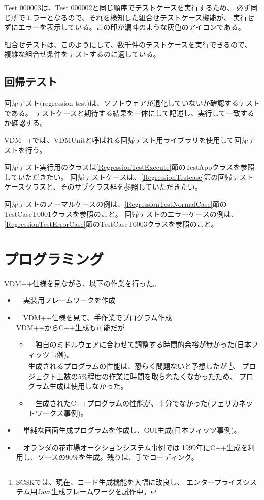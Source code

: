 Test 000003は、Test 000002と同じ順序でテストケースを実行するため、
必ず同じ所でエラーとなるので、それを検知した組合せテストケース機能が、
実行せずにエラーを表示している。この印が漏斗のような灰色のアイコンである。

組合せテストは、このようにして、数千件のテストケースを実行できるので、
複雑な組合せ条件をテストするのに適している。


\subsection{回帰テスト}
	\label{RegressionTest}

	回帰テスト(regression test)は、ソフトウェアが退化していないか確認するテストである。
	テストケースと期待する結果を一体にして記述し、実行して一致するか確認する。

	VDM++では、VDMUnitと呼ばれる回帰テスト用ライブラリを使用して回帰テストを行う。

	回帰テスト実行用のクラスは\ref{RegressionTestExecute}節のTestAppクラスを参照していただきたい。
	回帰テストケースは、\ref{RegressionTestcase}節の回帰テストケースクラスと、そのサブクラス群を参照していただきたい。

	回帰テストのノーマルケースの例は、\ref{RegressionTestNormalCase}節のTestCaseT0001クラスを参照のこと。
	回帰テストのエラーケースの例は、\ref{RegressionTestErrorCase}節のTestCaseT0003クラスを参照のこと。


\section{プログラミング}
	\label{Programming}

	VDM++仕様を見ながら、以下の作業を行った。

	\begin{itemize}
	\item　実装用フレームワークを作成
	\item　VDM++仕様を見て、手作業でプログラム作成 \\
		VDM++からC++生成も可能だが
		\begin{itemize}
		\item　独自のミドルウェアに合わせて調整する時間的余裕が無かった(日本フィッツ事例)。 \\
					生成されるプログラムの性能は、恐らく問題ないと予想したが
						\footnote{SCSKでは、現在、コード生成機能を大幅に改良し、
							エンタープライズシステム用Java生成フレームワークを試作中。}、
					プロジェクト工数の5\%程度の作業に時間を取られたくなかったため、
					プログラム生成は使用しなかった。
		\item　生成されたC++プログラムの性能が、十分でなかった(フェリカネットワークス事例)。
		\end{itemize} 
	\item　単純な画面生成プログラムを作成し、GUI生成(日本フィッツ事例)。
	\item　オランダの花市場オークションシステム事例では
		1999年にC++生成を利用し、ソースの90\%を生成。残りは、手でコーディング。
	\end{itemize} 

